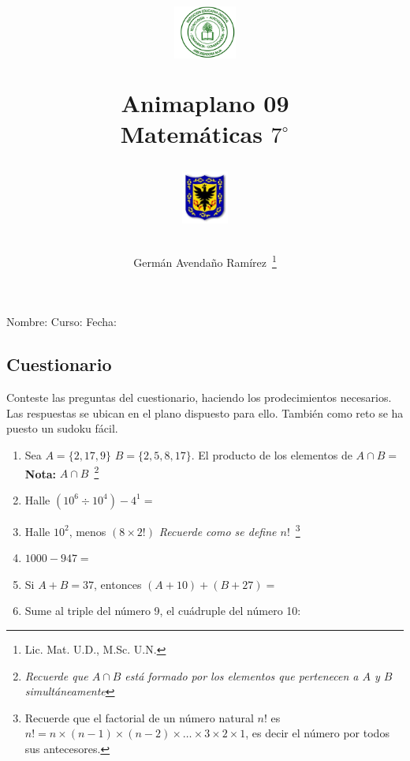 \documentclass[10pt,twoside]{article}
\author{Germ\'an Avenda\~no Ram\'irez~\thanks{Lic. Mat. U.D., M.Sc. U.N.}}
\title{\begin{minipage}{.2\textwidth}
\includegraphics[height=1.75cm]{Images/logo-colegio.png}\end{minipage}
\begin{minipage}{.55\textwidth}
\begin{center}
Animaplano 09 \\
Matemáticas $7^{\circ}$
\end{center}
\end{minipage}\hfill
\begin{minipage}{.2\textwidth}
\includegraphics[height=1.75cm]{Images/logo-sed.png} 
\end{minipage}}
\date{}
\begin{document}
\maketitle
Nombre: \hrulefill Curso: \underline{\hspace{1cm}}  Fecha: \underline{\hspace{2cm}}
\subsection*{Cuestionario}
Conteste las preguntas del cuestionario, haciendo los prodecimientos necesarios. Las respuestas se ubican en el plano dispuesto para ello. También como reto se ha puesto un sudoku fácil.
\begin{enumerate}
  \item Sea $ A=\{2,17,9\} $ $ B=\{2,5,8,17\} $. El producto de los elementos de $ A\cap B= $\\ \textbf{Nota:} $A\cap B$~\footnote{\emph{Recuerde que $A\cap B$ está formado por los elementos que pertenecen a $A$ y $B$ simultáneamente}}
  \item Halle $ (10^6\div10^4)-4^1= $
  \item Halle $ 10^2 $, menos $ (8\times2!)$ \textit{Recuerde como se define $n!$}~\footnote{Recuerde que el factorial de un número natural $ n! $ es $ n!=n\times(n-1)\times(n-2)\times\ldots\times3\times2\times1 $, es decir el número por todos sus antecesores.} 
  \item $ 1000-947= $
  \item Si $A+B=37$, entonces $(A+10)+(B+27)=$
  \item Sume al triple del número 9, el cuádruple del número 10:
\end{enumerate}
\end{document}
